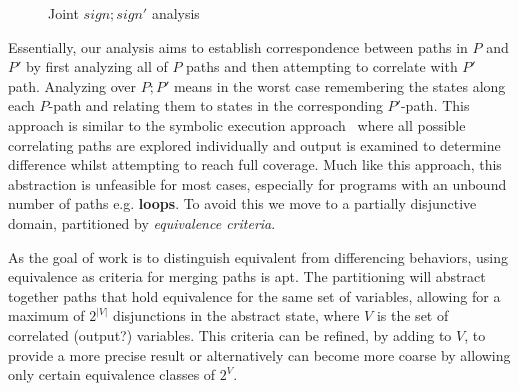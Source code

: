 \begin{figure}
\caption{Joint $sign;sign'$ analysis}
\end{figure}
Essentially, our analysis aims to establish correspondence between paths in $P$ and $P'$ by first analyzing all of $P$ paths and then attempting to correlate with $P'$ path. Analyzing over $P;P'$ means in the worst case remembering the states along each $P$-path and relating them to states in the corresponding $P'$-path. This approach is similar to the symbolic execution approach~\cite{} where all possible correlating paths are explored individually and output is examined to determine difference whilst attempting to reach full coverage. Much like this approach, this abstraction is unfeasible for most cases, especially for programs with an unbound number of paths e.g. \textbf{loops}. To avoid this we move to a partially disjunctive domain, partitioned by \emph{equivalence criteria}.

As the goal of work is to distinguish equivalent from differencing behaviors, using equivalence as criteria for merging paths is apt. The partitioning will abstract together paths that hold equivalence for the same set of variables, allowing for a maximum of $2^{|V|}$ disjunctions in the abstract state, where $V$ is the set of correlated (output?) variables. This criteria can be refined, by adding to $V$, to provide a more precise result or alternatively can become more coarse by allowing only certain equivalence classes of $2^{V}$.

